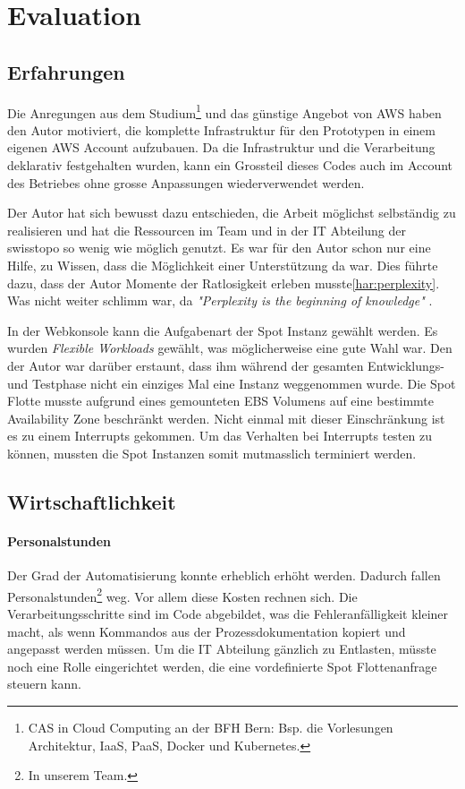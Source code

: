 \section{Evaluation}
\subsection{Erfahrungen}
Die Anregungen aus dem Studium\footnote{CAS in Cloud Computing an der BFH Bern: Bsp. die Vorlesungen Architektur, IaaS, PaaS, Docker und Kubernetes.} und das günstige Angebot von AWS haben den Autor motiviert, die komplette Infrastruktur für den Prototypen in einem eigenen AWS Account aufzubauen. Da die Infrastruktur und die Verarbeitung deklarativ festgehalten wurden, kann ein Grossteil dieses Codes auch im Account des Betriebes ohne grosse Anpassungen wiederverwendet werden.

Der Autor hat sich bewusst dazu entschieden, die Arbeit möglichst selbständig zu realisieren und hat die Ressourcen im Team und in der IT Abteilung der swisstopo so wenig wie möglich genutzt. Es war für den Autor schon nur eine Hilfe, zu Wissen, dass die Möglichkeit einer Unterstützung da war. Dies führte dazu, dass der Autor Momente der Ratlosigkeit erleben musste\ref{har:perplexity}. Was nicht weiter schlimm war, da \textit{"Perplexity is the beginning of knowledge"} \autocite[33]{CloudNativ:1}.

In der Webkonsole kann die Aufgabenart der Spot Instanz gewählt werden. Es wurden \emph{Flexible Workloads} gewählt, was möglicherweise eine gute Wahl war. Den der Autor war darüber erstaunt, dass ihm während der gesamten Entwicklungs- und Testphase nicht ein einziges Mal eine Instanz weggenommen wurde. Die Spot Flotte musste aufgrund eines gemounteten EBS Volumens auf eine bestimmte Availability Zone beschränkt werden. Nicht einmal mit dieser Einschränkung ist es zu einem Interrupts gekommen. Um das Verhalten bei Interrupts testen zu können, mussten die Spot Instanzen somit mutmasslich terminiert werden.


\subsection{Wirtschaftlichkeit}\label{kap:wirtschaftlichkeit}
\paragraph{Personalstunden}
Der Grad der Automatisierung konnte erheblich erhöht werden. Dadurch fallen Personalstunden\footnote{In unserem Team.} weg. Vor allem diese Kosten rechnen sich. Die Verarbeitungsschritte sind im Code abgebildet, was die Fehleranfälligkeit kleiner macht, als wenn Kommandos aus der Prozessdokumentation kopiert und angepasst werden müssen. Um die IT Abteilung gänzlich zu Entlasten, müsste noch eine Rolle eingerichtet werden, die eine vordefinierte Spot Flottenanfrage steuern kann.
